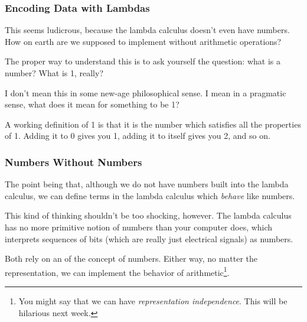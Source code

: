 \documentclass[aspectratio=169, handout]{beamer}
\begin{document}
\begin{frame}[fragile]
  \frametitle{Encoding Data with Lambdas}

  This seems ludicrous, because the lambda calculus doesn't even have
  numbers. How on earth are we supposed to implement 
  without arithmetic operations?

  \pause
  \vspace{\fill}

  The proper way to understand this is to ask yourself the question:
  what is a number? What is 1, really?

  \pause
  \vspace{\fill}

  I don't mean this in some new-age philosophical sense. I mean in
  a pragmatic sense, what does it mean for something to be 1?

  \pause
  \vspace{\fill}

  A working definition of 1 is that it is the number which satisfies
  all the properties of 1. Adding it to 0 gives you 1, adding it to
  itself gives you 2, and so on.
\end{frame}

\begin{frame}[fragile]
  \frametitle{Numbers Without Numbers}

  The point being that, although we do not have numbers built into
  the lambda calculus, we can define terms in the lambda calculus
  which \textit{behave} like numbers.

  \pause
  \vspace{\fill}

  This kind of thinking shouldn't be too shocking, however. The
  lambda calculus has no more primitive notion of numbers than
  your computer does, which interprets sequences of bits (which are
  really just electrical signals) as numbers.

  \pause
  \vspace{\fill}

  Both rely on an  of the concept of numbers. Either
  way, no matter the representation, we can implement the behavior
  of arithmetic\footnote{You might say that we can have
  \textit{representation independence}. This will be hilarious next week.}.
\end{frame}
\end{document}
